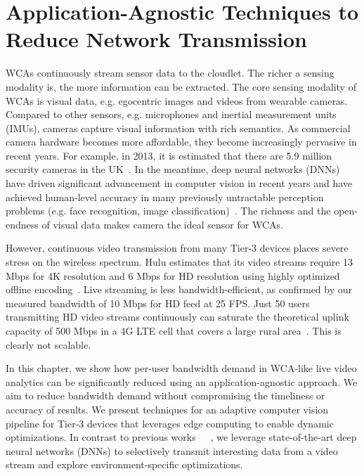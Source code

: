 \chapter{Application-Agnostic Techniques to Reduce Network Transmission}
\label{chapter: bandwidth}

WCAs continuously stream sensor data to the cloudlet. The richer a sensing
modality is, the more information can be extracted. The core sensing modality of
WCAs is visual data, e.g. egocentric images and videos from wearable cameras.
Compared to other sensors, e.g. microphones and inertial measurement units
(IMUs), cameras capture visual information with rich semantics. As commercial
camera hardware becomes more affordable, they become increasingly pervasive in
recent years. For example, in 2013, it is estimated that there are 5.9 million
security cameras in the UK~\cite{Barrett2013}. In the meantime, deep neural
networks (DNNs) have driven significant advancement in computer vision in recent
years and have achieved human-level accuracy in many previously untractable
perception problems (e.g. face recognition, image
classification)~\cite{learned2016labeled, schroff2015facenet}. The richness and
the open-endness of visual data makes camera the ideal sensor for WCAs.

However, continuous video transmission from many Tier-3 devices places severe
stress on the wireless spectrum.  Hulu estimates that its video streams require
13 Mbps for 4K resolution and 6 Mbps for HD resolution using highly optimized
offline encoding~\cite{Hulu2017}. Live streaming is less bandwidth-efficient, as
confirmed by our measured bandwidth of 10 Mbps for HD feed at 25 FPS. Just 50
users transmitting HD video streams continuously can saturate the theoretical
uplink capacity of 500 Mbps in a 4G LTE cell that covers a large rural
area~\cite{LteWorld2009}.  This is clearly not scalable.

In this chapter, we show how per-user bandwidth demand in WCA-like live video
analytics can be significantly reduced using an application-agnostic approach.
We aim to reduce bandwidth demand without compromising the timeliness or
accuracy of results. We present techniques for an adaptive computer vision
pipeline for Tier-3 devices that leverages edge computing to enable dynamic
optimizations. In contrast to previous
works~\cite{Wang2017networked}~\cite{zhang2015design}~\cite{Wang2016skyeyes}, we
leverage state-of-the-art deep neural networks (DNNs) to selectively transmit
interesting data from a video stream and explore environment-specific
optimizations. 


